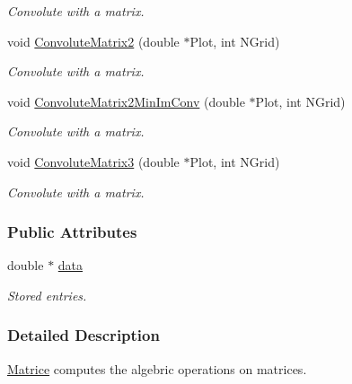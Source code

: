 \begin{DoxyCompactItemize}
\begin{DoxyCompactList}\small\item\em \-Convolute with a matrix. \end{DoxyCompactList}\item 
void \hyperlink{classMatrice_af0c76ea6dc869dc8a9868d200cd8585d}{\-Convolute\-Matrix2} (double $\ast$\-Plot, int \-N\-Grid)
\begin{DoxyCompactList}\small\item\em \-Convolute with a matrix. \end{DoxyCompactList}\item 
void \hyperlink{classMatrice_abeb003c7b0ee7b24821ee9fedd83ab78}{\-Convolute\-Matrix2\-Min\-Im\-Conv} (double $\ast$\-Plot, int \-N\-Grid)
\begin{DoxyCompactList}\small\item\em \-Convolute with a matrix. \end{DoxyCompactList}\item 
\hypertarget{classMatrice_a1bbd091a9143f3e458569b5c0f6d1d4e}{void \hyperlink{classMatrice_a1bbd091a9143f3e458569b5c0f6d1d4e}{\-Convolute\-Matrix3} (double $\ast$\-Plot, int \-N\-Grid)}\label{classMatrice_a1bbd091a9143f3e458569b5c0f6d1d4e}

\begin{DoxyCompactList}\small\item\em \-Convolute with a matrix. \end{DoxyCompactList}\end{DoxyCompactItemize}
\subsubsection*{\-Public \-Attributes}
\begin{DoxyCompactItemize}
\item 
\hypertarget{classMatrice_a23436a7a2b44939627b59df11be7ad75}{double $\ast$ \hyperlink{classMatrice_a23436a7a2b44939627b59df11be7ad75}{data}}\label{classMatrice_a23436a7a2b44939627b59df11be7ad75}

\begin{DoxyCompactList}\small\item\em \-Stored entries. \end{DoxyCompactList}\end{DoxyCompactItemize}


\subsubsection{\-Detailed \-Description}
\hyperlink{classMatrice}{\-Matrice} computes the algebric operations on matrices. 

